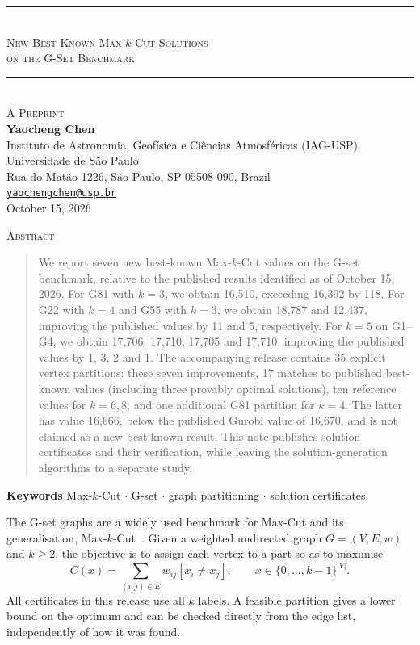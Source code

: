 \documentclass[10pt,letterpaper]{article}
\makeatletter
\renewcommand\section{\@startsection{section}{1}{0pt}{1.5ex plus .6ex minus .2ex}{.7ex plus .2ex}{\normalfont\large\bfseries}}
\makeatother
\begin{document}
\thispagestyle{empty}
\begin{center}
\rule{\textwidth}{1.2pt}\\[7pt]
{\Large\scshape New Best-Known Max-$k$-Cut Solutions\\[3pt]on the G-Set Benchmark}\\[7pt]
\rule{\textwidth}{0.6pt}\\[8pt]
\textsc{A Preprint}\\[13pt]
\textbf{Yaocheng Chen}\\[3pt]
Instituto de Astronomia, Geof\'isica e Ci\^encias Atmosf\'ericas (IAG-USP)\\
Universidade de S\~ao Paulo\\
Rua do Mat\~ao 1226, S\~ao Paulo, SP 05508-090, Brazil\\
\href{mailto:yaochengchen@usp.br}{\texttt{yaochengchen@usp.br}}\\[12pt]
October 15, 2026
\end{center}

\begin{center}\textsc{Abstract}\end{center}
\begin{quote}
We report seven new best-known Max-$k$-Cut values on the G-set benchmark,
relative to the published results identified as of October 15, 2026.
For G81 with $k=3$, we obtain 16{,}510, exceeding 16{,}392 by 118.
For G22 with $k=4$ and G55 with $k=3$, we obtain 18{,}787 and 12{,}437,
improving the published values by 11 and 5, respectively.
For $k=5$ on G1--G4, we obtain 17{,}706, 17{,}710, 17{,}705 and 17{,}710,
improving the published values by 1, 3, 2 and 1.
The accompanying release contains 35 explicit vertex partitions: these seven
improvements, 17 matches to published best-known values (including three
provably optimal solutions), ten reference values for $k=6,8$, and one
additional G81 partition for $k=4$. The latter has value 16{,}666, below the
published Gurobi value of 16{,}670, and is not claimed as a new best-known result.
This note publishes solution certificates and their verification, while leaving
the solution-generation algorithms to a separate study.
\end{quote}
\textbf{Keywords} Max-$k$-Cut $\cdot$ G-set $\cdot$ graph partitioning $\cdot$ solution certificates.

\section{Introduction}
The G-set graphs are a widely used benchmark for Max-Cut and its generalisation,
Max-$k$-Cut~\cite{gset,moh}. Given a weighted undirected graph $G=(V,E,w)$ and
$k\ge2$, the objective is to assign each vertex to a part so as to maximise
\begin{equation}
 C(x)=\sum_{(i,j)\in E}w_{ij}[x_i\ne x_j],\qquad x\in\{0,\ldots,k-1\}^{|V|}.
 \label{eq:cut}
\end{equation}
All certificates in this release use all $k$ labels. A feasible partition gives
a lower bound on the optimum and can be checked directly from the edge list,
independently of how it was found.
\end{document}
